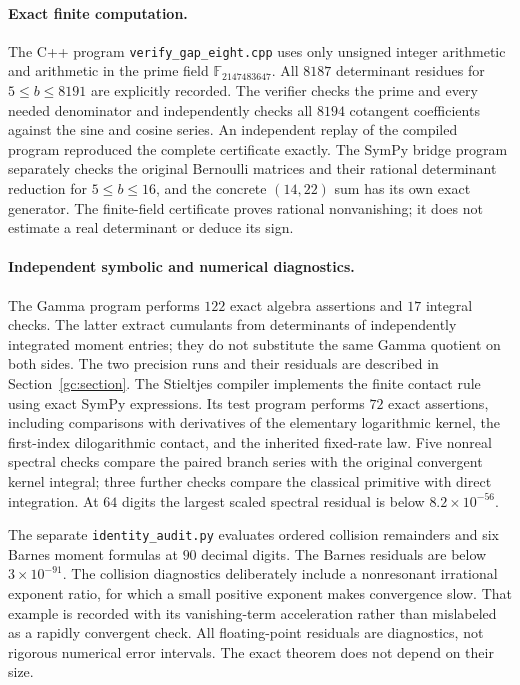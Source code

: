\documentclass[11pt,a4paper]{article}
\numberwithin{equation}{section}
\theoremstyle{definition}
\theoremstyle{remark}
\begin{document}
\paragraph{Exact finite computation.}
The C++ program \texttt{verify\_gap\_eight.cpp} uses only unsigned
integer arithmetic and arithmetic in the prime field
$\mathbb F_{2147483647}$. All $8187$ determinant residues for
$5\le b\le8191$ are explicitly recorded. The verifier checks the
prime and every needed denominator and independently checks all
$8194$ cotangent coefficients against the sine and cosine series.
An independent replay of the compiled program reproduced the complete
certificate exactly. The SymPy bridge program separately checks the
original Bernoulli matrices and their rational determinant reduction
for $5\le b\le16$, and the concrete $(14,22)$ sum has its own exact
generator. The finite-field certificate proves rational nonvanishing;
it does not estimate a real determinant or deduce its sign.

\paragraph{Independent symbolic and numerical diagnostics.}
The Gamma program performs $122$ exact algebra assertions and $17$
integral checks. The latter extract cumulants from determinants of
independently integrated moment entries; they do not substitute the
same Gamma quotient on both sides. The two precision runs and their
residuals are described in Section~\ref{gc:section}.
The Stieltjes compiler implements the finite contact rule using exact
SymPy expressions. Its test program performs $72$ exact assertions,
including comparisons with derivatives of the elementary logarithmic
kernel, the first-index dilogarithmic contact, and the inherited
fixed-rate law. Five nonreal spectral checks compare the paired branch
series with the original convergent kernel integral; three further
checks compare the classical primitive with direct integration.
At $64$ digits the largest scaled spectral residual is below
$8.2\times10^{-56}$.

The separate \texttt{identity\_audit.py} evaluates ordered collision
remainders and six Barnes moment formulas at $90$ decimal digits.
The Barnes residuals are below $3\times10^{-91}$. The collision
diagnostics deliberately include a nonresonant irrational exponent
ratio, for which a small positive exponent makes convergence slow.
That example is recorded with its vanishing-term acceleration rather
than mislabeled as a rapidly convergent check. All floating-point
residuals are diagnostics, not rigorous numerical error intervals.
The exact theorem does not depend on their size.
\end{document}
